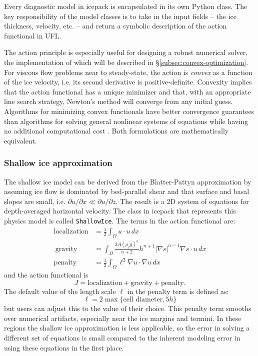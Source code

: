 \documentclass[journal abbreviation, manuscript]{copernicus}
\begin{document}
Every diagnostic model in icepack is encapsulated in its own Python class.
The key responsibility of the model classes is to take in the input fields -- the ice thickness, velocity, etc. -- and return a symbolic description of the action functional in UFL.

The action principle is especially useful for designing a robust numerical solver, the implementation of which will be described in \S\ref{subsec:convex-optimization}.
For viscous flow problems near to steady-state, the action is \emph{convex} as a function of the ice velocity, i.e. its second derivative is positive-definite.
Convexity implies that the action functional has a unique minimizer and that, with an appropriate line search strategy, Newton's method will converge from any initial guess.
Algorithms for minimizing convex functionals have better convergence guarantees than algorithms for solving general nonlinear systems of equations while having no additional computational cost \citep{nocedal2006numerical}.
Both formulations are mathematically equivalent.

\subsubsection{Shallow ice approximation}\label{subsubsec:shallow-ice}

The shallow ice model can be derived from the Blatter-Pattyn approximation by assuming ice flow is dominated by bed-parallel shear and that surface and basal slopes are small, i.e. $\partial u/\partial x \ll \partial u/\partial z$.
The result is a 2D system of equations for depth-averaged horizontal velocity.
The class in icepack that represents this physics model is called \texttt{ShallowIce}.
The terms in the action functional are:
\begin{align}
    \text{localization} & =\frac{1}{2}\int_\Omega u\cdot u\,dx\\\
    \text{gravity} & = \int_\Omega\frac{2A(\rho_I g)^n}{n+2} h^{n + 1}|\nabla s|^{n - 1}\nabla s\cdot u\,dx\\
    \text{penalty} & = \frac{1}{2}\int_\Omega \ell^2\nabla u\cdot \nabla u\,dx
\end{align}
and the action functional is
\begin{equation}
    J = \text{localization} + \text{gravity} + \text{penalty}.
\end{equation}
The default value of the length scale $\ell$ in the penalty term is defined as:
\begin{equation}
    \ell = 2\max\{\text{cell diameter}, 5h\}
\end{equation}
but users can adjust this to the value of their choice.
This penalty term smooths over numerical artifacts, especially near the ice margins and termini.
In these regions the shallow ice approximation is less applicable, so the error in solving a different set of equations is small compared to the inherent modeling error in using these equations in the first place.
\end{document}
